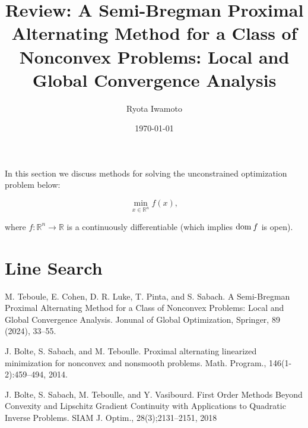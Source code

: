 \documentclass[a4paper,11pt]{jsarticle}
\theoremstyle{definition}
\newcommand{\RealNumberSet}{\mathbb{R}}
\newcommand{\Domain}[1]{\text{\rm dom\:${#1}$}} %
\begin{document}
\title{%
  Review: A Semi-Bregman Proximal Alternating Method for a Class of Nonconvex Problems: Local and Global Convergence Analysis}
\author{Ryota Iwamoto}
\date{\today}
\maketitle

In this section we discuss methods for solving the unconstrained optimization
problem below:

\begin{equation}
  \label{eq:unconstrained_optimization}
  \min_{x \in \RealNumberSet^n} f(x),
\end{equation}

where $f: \RealNumberSet^n \to \RealNumberSet$ is a continuously differentiable (which implies $\Domain{f}$ is open).

\section{Line Search}





\begin{thebibliography}{99}
  M. Teboule, E. Cohen, D. R. Luke, T. Pinta, and S. Sabach.
  A Semi-Bregman Proximal Alternating Method for a Class of Nonconvex Problems: Local and Global Convergence Analysis.
  Jonunal of Global Optimization, Springer, 89 (2024), 33--55.

  J. Bolte, S. Sabach, and M. Teboulle.
  Proximal alternating linearized minimization for nonconvex and nonsmooth problems.
  Math. Program., 146(1-2):459--494, 2014.

  J. Bolte, S. Sabach, M. Teboulle, and Y. Vasibourd.
  First Order Methods Beyond Convexity and Lipschitz Gradient Continuity with Applications to Quadratic Inverse Problems.
  SIAM J. Optim., 28(3);2131--2151, 2018

\end{thebibliography}
\end{document}
